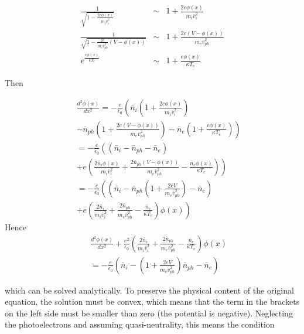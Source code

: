 \documentclass[a4paper,11pt]{thesis}
\begin{document}
\begin{eqnarray}
  \frac{1}{\sqrt{1-\frac{2e\phi(x)}{m_i\bar{v}_i^2}}} &\sim& 1+\frac{2e\phi(x)}{m_i\bar{v}_i^2} \\
\frac{1}{\sqrt{1-\frac{2e}{m_e\bar{v}_{ph}^2}\left(V-\phi(x)\right)}} &\sim& 1+\frac{2e\left(V-\phi(x)\right)}{m_e\bar{v}_{ph}^2} \\
e^{\frac{e\phi(x)}{kT_e}} &\sim& 1+\frac{e\phi(x)}{\kappa T_e}
\end{eqnarray}

Then

\begin{eqnarray}
    &&\frac{d^2\phi(x)}{dx^2}=-\frac{e}{\epsilon_0}\left(\bar{n}_i  \left(1+\frac{2e\phi(x)}{m_i\bar{v}_i^2}\right) \right.\\
    &&\left. -\bar{n}_{ph}\left(  1+\frac{2e\left(V-\phi(x)\right)}{m_e\bar{v}_{ph}^2}\right)-\bar{n}_e \left( 1+\frac{e\phi(x)}{\kappa T_e} \right) \right)\nonumber\\
&&=-\frac{e}{\epsilon_0}\left( (\bar{n}_i -  \bar{n}_{ph} -  \bar{n}_e ) \right. \nonumber\\
&& \left. + e\left( \frac{2\bar{n}_i \phi(x)}{m_i\bar{v}_i^2} +\frac{2\bar{n}_{ph}(V-\phi(x))}{m_e\bar{v}_{ph}^2}-\frac{\bar{n}_e \phi(x)}{\kappa T_e}\right)  \right)\nonumber\\
&&=-\frac{e}{\epsilon_0}\left( \left(\bar{n}_i -  \bar{n}_{ph} \left( 1+ \frac{2eV}{m_e\bar{v}_{ph}^2}\right)-  \bar{n}_e \right)\right.\nonumber \\
&& \left. + e\left( \frac{2\bar{n}_i}{m_i\bar{v}_i^2} +\frac{2\bar{n}_{ph}}{m_e\bar{v}_{ph}^2}-\frac{\bar{n}_e }{\kappa T_e}\right)\phi(x)  \right)  \nonumber
\end{eqnarray}
Hence
\begin{eqnarray}
 &&\frac{d^2\phi(x)}{dx^2}+\frac{e^2}{\epsilon_0}\left( \frac{2\bar{n}_i }{m_i\bar{v}_i^2} +\frac{2\bar{n}_{ph}}{m_e\bar{v}_{ph}^2}-\frac{\bar{n}_e }{\kappa T_e}\right)\phi(x) \\
 &&=-\frac{e}{\epsilon_0}\left( \bar{n}_i - \left( 1+ \frac{2eV}{m_e\bar{v}_{ph}^2}\right) \bar{n}_{ph} -  \bar{n}_e  \right)\nonumber
\end{eqnarray}

which can be solved analytically. To preserve the physical content of the original equation, the solution must be convex, which means that the term in the brackets on the left side must be smaller than zero (the potential is negative). Neglecting the photoelectrons and assuming quasi-neutrality, this means the condition
\end{document}
